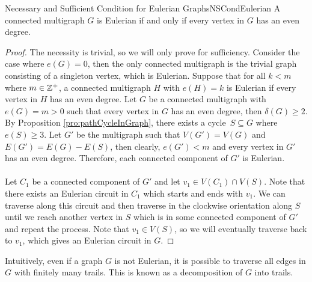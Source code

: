 \documentclass[math]{amznotes}
\theoremstyle{remark}
\newcommand{\0}{\mathbf{0}}
\newcommand{\1}{\mathbf{1}}
\begin{document}
\begin{thmbox}{Necessary and Sufficient Condition for Eulerian Graphs}{NSCondEulerian}
    A connected multigraph $G$ is Eulerian if and only if every vertex in $G$ has an even degree.
    \tcblower
    \begin{proof}
        The necessity is trivial, so we will only prove for sufficiency. Consider the case where $e(G) = 0$, then the only connected multigraph is the trivial graph consisting of a singleton vertex, which is Eulerian. Suppose that for all $k < m$ where $m \in \mathbb{Z}^+$, a connected multigraph $H$ with $e(H) = k$ is Eulerian if every vertex in $H$ has an even degree. Let $G$ be a connected multigraph with $e(G) = m > 0$ such that every vertex in $G$ has an even degree, then $\delta(G) \geq 2$. By Proposition \ref{pro:pathCycleInGraph}, there exists a cycle~$S \subseteq G$ where $e(S) \geq 3$. Let $G'$ be the multigraph such that $V(G') = V(G)$ and~$E(G') = E(G) - E(S)$, then clearly, $e(G') < m$ and every vertex in $G'$ has an even degree. Therefore, each connected component of $G'$ is Eulerian.
        \\\\
        Let $C_1$ be a connected component of $G'$ and let $v_1 \in V(C_1) \cap V(S)$. Note that there exists an Eulerian circuit in $C_1$ which starts and ends with $v_1$. We can traverse along this circuit and then traverse in the clockwise orientation along $S$ until we reach another vertex in $S$ which is in some connected component of $G'$ and repeat the process. Note that $v_1 \in V(S)$, so we will eventually traverse back to $v_1$, which gives an Eulerian circuit in $G$.
    \end{proof}
\end{thmbox}
Intuitively, even if a graph $G$ is not Eulerian, it is possible to traverse all edges in $G$ with finitely many trails. This is known as a decomposition of $G$ into trails.
\end{document}
